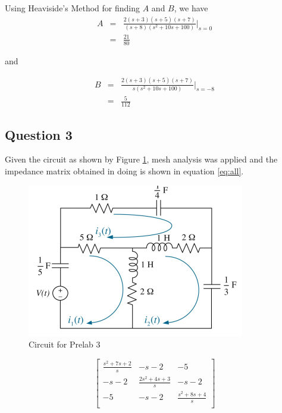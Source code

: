 \documentclass[12pt, a4paper]{article}
\begin{document}
		\noindent Using Heaviside's Method for finding $A$ and $B$, we have
		\[
			\begin{array}{rcl}
				A & = & \frac{2(s+3)(s+5)(s+7)}{(s+8)(s^2 + 10s + 100)}\bigg\rvert_{s=0} \\
				& = & \frac{21}{80}
			\end{array}
		\]

		\noindent and

		\[
			\begin{array}{rcl}
				B & = & \frac{2(s+3)(s+5)(s+7)}{s(s^2 + 10s + 100)}\bigg\rvert_{s=-8} \\
				& = & \frac{5}{112}
			\end{array}
		\]

	\subsection*{Question 3} %
	\label{sub:question_3}
	Given the circuit as shown by Figure \ref{fig:circuit}, mesh analysis was applied and the impedance matrix obtained in doing is shown in equation \ref{eq:all}.


	\begin{figure}[H]
		\centering
		\includegraphics[width=\textwidth]{circuit}
		\caption{Circuit for Prelab 3}
		\label{fig:circuit}
	\end{figure}

	\begin{equation}
		\label{eq:all}
		\begin{bmatrix}
		    \frac{s^2+7s+2}{s}	&	-s-2	&	-5\\
		    -s-2      			& 	\frac{2s^2+4s+3}{s}  & 	-s-2\\
		    -5      			& 	-s-2  & 	\frac{s^2+8s+4}{s}\\
		\end{bmatrix}
	\end{equation}
\end{document}
